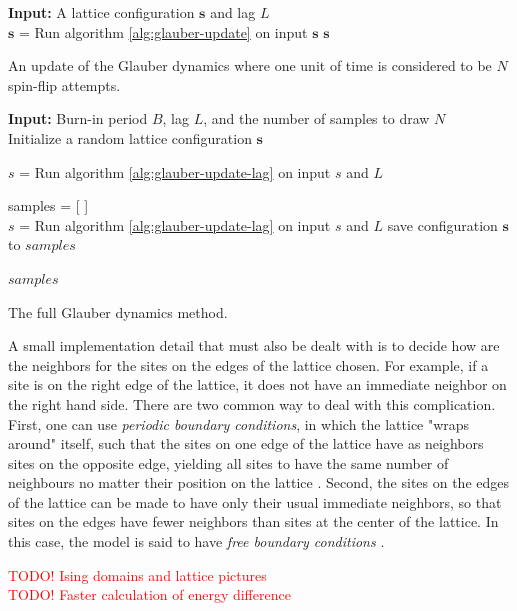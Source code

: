 \documentclass[12pt]{article}
\begin{document}
\begin{algorithm}
\textbf{Input:} A lattice configuration $\boldsymbol{s}$ and lag $L$ \\
 {
	$\boldsymbol{s}$ = Run algorithm \ref{alg:glauber-update} on input $\boldsymbol{s}$\;
}
\Return $\boldsymbol{s}$\;
\label{alg:glauber-update-lag}
\caption{An update of the Glauber dynamics where one unit of time is considered to be $N$ spin-flip attempts.}
\end{algorithm}

\begin{algorithm}
\textbf{Input:} Burn-in period $B$, lag $L$, and the number of samples to draw $N$ \\ 
Initialize a random lattice configuration $\boldsymbol{s}$\;

 {  
	$s$ = Run algorithm \ref{alg:glauber-update-lag} on input $s$ and $L$\;
}

samples = [ ]  \\
 {
	$s$ = Run algorithm \ref{alg:glauber-update-lag} on input $s$ and $L$\;
	save configuration $\boldsymbol{s}$ to $samples$\;
}

\Return $samples$
\label{alg:glauber-full}
\caption{The full Glauber dynamics method.}
\end{algorithm}

A small implementation detail that must also be dealt with is to decide how are the neighbors for the sites on the edges of the lattice chosen. For example, if a site is on the right edge of the lattice, it does not have an immediate neighbor on the right hand side. There are two common way to deal with this complication. First, one can use \textit{periodic boundary conditions}, in which the lattice "wraps around" itself, such that the sites on one edge of the lattice have as neighbors sites on the opposite edge, yielding all sites to have the same number of neighbours no matter their position on the lattice \cite{spin-models-thesis}. Second, the sites on the edges of the lattice can be made to have only their usual immediate neighbors, so that sites on the edges have fewer neighbors than sites at the center of the lattice. In this case, the model is said to have \textit{free boundary conditions} \cite{spin-models-thesis}.

\textcolor{red}{TODO! Ising domains and lattice pictures} \\ 
\textcolor{red}{TODO! Faster calculation of energy difference}
\end{document}

